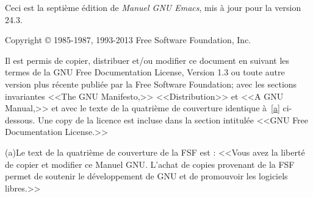 \documentclass[french]{book}
\begin{document}
\maketitle





\frontmatter

Ceci est la septième édition de \emph{Manuel GNU Emacs}, mis à jour
pour la version 24.3.

Copyright \copyright{} 1985-1987, 1993-2013 Free Software Foundation,
Inc.

Il est permis de copier, distribuer et/ou modifier ce document en
suivant les termes de la GNU Free Documentation License, Version 1.3
ou toute autre version plus récente publiée par la Free Software
Foundation; avec les sections invariantes <<The GNU Manifesto,>>
<<Distribution>> et <<A GNU Manual,>> et avec le texte de la quatrième de
couverture identique à~\ref{a} ci-dessous. Une copy de la licence est
incluse dans la section intitulée <<GNU Free Documentation License.>>

\label{a}(a)Le text de la quatrième de couverture de la FSF est
: <<Vous avez la liberté de copier et modifier ce Manuel GNU. L'achat
de copies provenant de la FSF permet de soutenir le développement de
GNU et de promouvoir les logiciels libres.>>


\tableofcontents


 
 
 




\mainmatter                                     
\end{document}
